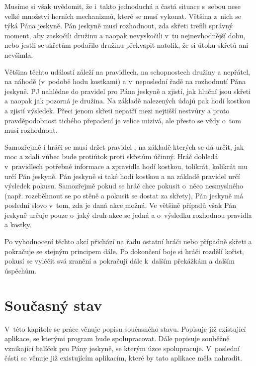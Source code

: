 \documentclass[thesis=B,czech]{resources/FITthesis}[2012/06/26]
\begin{document}
Musíme si však uvědomit, že i~takto jednoduchá a častá situace s~sebou nese velké množství herních mechanizmů, které se musí vykonat. Většina z~nich se týká Pána jeskyně. Pán jeskyně musí rozhodnout, zda skřeti trefili správný moment, aby zaskočili družinu a naopak nevyskočili v~tu nejnevhodnější dobu, nebo jestli se skřetům podařilo družinu překvapit natolik, že si útoku skřetů ani nevšimla. \par

Většina těchto událostí záleží na pravidlech, na schopnostech družiny a nepřátel, na náhodě (v~podobě hodu kostkami) a v~neposlední řadě na rozhodnutí Pána jeskyně. PJ nahlédne do pravidel pro Pána jeskyně\cite{draci_doupe_PJ} a zjistí, jak hluční jsou skřeti a naopak jak pozorná je družina. Na základě nalezených údajů pak hodí kostkou a zjistí výsledek. Přeci jenom skřeti nepatří mezi nejtišší nestvůry a proto pravděpodobnost tichého přepadení je velice mizivá, ale přesto se vždy o~tom musí rozhodnout. \par

Samozřejmě i hráči se musí držet pravidel \cite{draci_doupe}, na základě kterých se dá určit, jak moc a zdali vůbec bude protiútok proti skřetům účinný. Hráč dohledá v~pravidlech potřebné informace a zpravidla hodí kostkou, tolikrát, kolikrát mu určí Pán jeskyně. Pán jeskyně si také hodí kostkou a na základě pravidel určí výsledek pokusu. Samozřejmě pokud se hráč chce pokusit o~něco nesmyslného (např. rozeběhnout se po stěně a pokusit se dostat za skřety), Pán jeskyně má poslední slovo v~tom, zda je daná akce možná. Ve většině případů však Pán jeskyně určuje pouze o~jaký druh akce se jedná a o~výsledku rozhodnou pravidla a kostky. \par

Po vyhodnocení těchto akcí přichází na řadu ostatní hráči nebo případně skřeti a pokračuje se stejným principem dále. Po dokončení boje si hráči rozdělí kořist, pokusí se vyléčit svá zranění a pokračují dále k~dalším překážkám a dalším úspěchům.

\chapter{Současný stav}
V~této kapitole se práce věnuje popisu současného stavu. Popisuje již existující aplikace, se kterými program bude spolupracovat. Dále popisuje souběžně vznikající balíček pro Pány jeskyně, se kterým úzce spolupracuje. V~poslední části se věnuje již existujícím aplikacím, které by tato aplikace měla nahradit.
\end{document}
